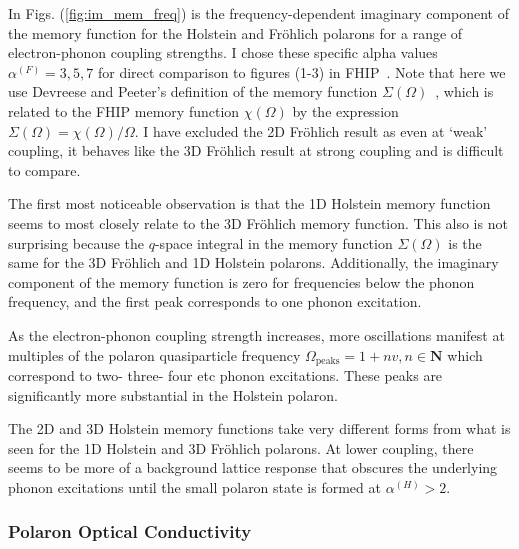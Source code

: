 In Figs. (\ref{fig:im_mem_freq}) is the frequency-dependent imaginary component of the memory function for the Holstein and Fr\"ohlich polarons for a range of electron-phonon coupling strengths. I chose these specific alpha values $\alpha^{(F)} = 3, 5, 7$ for direct comparison to figures (1-3) in FHIP~\cite{feynman_mobility_1962}. Note that here we use Devreese and Peeter's definition of the memory function $\Sigma(\Omega)$~\cite{peeters_theory_1984}, which is related to the FHIP memory function $\chi(\Omega)$ by the expression $\Sigma(\Omega) = \chi(\Omega) / \Omega$. I have excluded the 2D Fr\"ohlich result as even at `weak' coupling, it behaves like the 3D Fr\"ohlich result at strong coupling and is difficult to compare.

The first most noticeable observation is that the 1D Holstein memory function seems to most closely relate to the 3D Fr\"ohlich memory function. This also is not surprising because the $q$-space integral in the memory function $\Sigma(\Omega)$ is the same for the 3D Fr\"ohlich and 1D Holstein polarons. Additionally, the imaginary component of the memory function is zero for frequencies below the phonon frequency, and the first peak corresponds to one phonon excitation.

As the electron-phonon coupling strength increases, more oscillations manifest at multiples of the polaron quasiparticle frequency $\Omega_{\text{peaks}} = 1 + n v, n \in \mathbf{N}$ which correspond to two- three- four etc phonon excitations. These peaks are significantly more substantial in the Holstein polaron. 

The 2D and 3D Holstein memory functions take very different forms from what is seen for the 1D Holstein and 3D Fr\"ohlich polarons. At lower coupling, there seems to be more of a background lattice response that obscures the underlying phonon excitations until the small polaron state is formed at $\alpha^{(H)} > 2$.

\subsubsection{Polaron Optical Conductivity}

